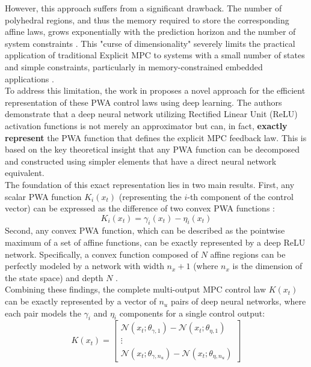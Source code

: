 However, this approach suffers from a significant drawback. The number of polyhedral regions, and thus the memory required to store the corresponding affine laws, grows exponentially with the prediction horizon and the number of system constraints \cite{karg2020efficient}. This "curse of dimensionality" severely limits the practical application of traditional Explicit MPC to systems with a small number of states and simple constraints, particularly in memory-constrained embedded applications \cite{karg2020efficient}.
\\
\noindent
To address this limitation, the work in \cite{karg2020efficient} proposes a novel approach for the efficient representation of these PWA control laws using deep learning. The authors demonstrate that a deep neural network utilizing Rectified Linear Unit (ReLU) activation functions is not merely an approximator but can, in fact, \textbf{exactly represent} the PWA function that defines the explicit MPC feedback law. This is based on the key theoretical insight that any PWA function can be decomposed and constructed using simpler elements that have a direct neural network equivalent.
\\
\noindent
The foundation of this exact representation lies in two main results. First, any scalar PWA function $K_i(x_t)$ (representing the $i$-th component of the control vector) can be expressed as the difference of two convex PWA functions \cite{karg2020efficient}:
\begin{equation}
    K_i(x_t) = \gamma_i(x_t) - \eta_i(x_t)
\end{equation}
Second, any convex PWA function, which can be described as the pointwise maximum of a set of affine functions, can be exactly represented by a deep ReLU network. Specifically, a convex function composed of $N$ affine regions can be perfectly modeled by a network with width $n_x + 1$ (where $n_x$ is the dimension of the state space) and depth $N$ \cite{karg2020efficient}.
\\
\noindent
Combining these findings, the complete multi-output MPC control law $K(x_t)$ can be exactly represented by a vector of $n_u$ pairs of deep neural networks, where each pair models the $\gamma_i$ and $\eta_i$ components for a single control output:
\begin{equation}
    K(x_t) = 
    \begin{bmatrix}
        \mathcal{N}(x_t; \theta_{\gamma,1}) - \mathcal{N}(x_t; \theta_{\eta,1}) \\
        \vdots \\
        \mathcal{N}(x_t; \theta_{\gamma,n_u}) - \mathcal{N}(x_t; \theta_{\eta,n_u})
    \end{bmatrix}
\end{equation}
